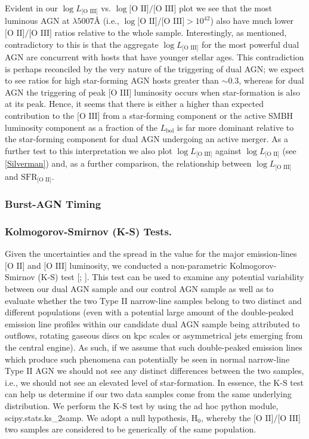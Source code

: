 Evident in our $\log{L_{\text{[O III]}}}$ vs. $\log{\text{[O II]}/\text{[O III]}}$ plot we see that the most luminous AGN at $\lambda5007$Å (i.e., $\log{\text{[O II]}/\text{[O III]}}>{10^{42}}$) also have much lower $\text{[O II]}/\text{[O III]}$ ratios relative to the whole sample. Interestingly, as mentioned, contradictory to this is that the aggregate $\log{L_{\text{[O III]}}}$ for the most powerful dual AGN are concurrent with hosts that have younger stellar ages. This contradiction is perhaps reconciled by the very nature of the triggering of dual AGN; we expect to see ratios for high star-forming AGN hosts greater than $\sim{0.3}$, whereas for dual AGN the triggering of peak $\text{[O III]}$ luminosity occurs when star-formation is also at its peak. Hence, it seems that there is either a higher than expected contribution to the $\text{[O III]}$ from a star-forming component or the active SMBH luminosity component as a fraction of the $L_{\text{bol}}$ is far more dominant relative to the star-forming component for dual AGN undergoing an active merger. As a further test to this interpretation we also plot $\log{L_{\text{[O III]}}}$ against $\log{L_{\text{[O II]}}}$ (see \ref{Silverman}) and, as a further comparison, the relationship between $\log{L_{\text{[O III]}}}$ and $\text{SFR}_{\text{[O II]}}$.

\subsubsection{Burst-AGN Timing}


 
\subsubsection{Kolmogorov-Smirnov (K-S) Tests.}

Given the uncertainties and the spread in the value for the major emission-lines $\text{[O II]}$ and $\text{[O III]}$ luminosity, we conducted a non-parametric Kolmogorov-Smirnov (K-S) test [\cite{Peacock_1983}; \cite{Justel_1997}]. This test can be used to examine any potential variability between our dual AGN sample and our control AGN sample as well as to evaluate whether the two Type II narrow-line samples belong to two distinct and different populations (even with a potential large amount of the double-peaked emission line profiles within our candidate dual AGN sample being attributed to outflows, rotating gaseous discs on kpc scales or asymmetrical jets emerging from the central engine). As such, if we assume that such double-peaked emission lines which produce such phenomena can potentially be seen in normal narrow-line Type II AGN we should not see any distinct differences between the two samples, i.e., we should not see an elevated level of star-formation. In essence, the K-S test can help us determine if our two data samples come from the same underlying distribution. We perform the K-S test by using the ad hoc python module, scipy.stats.ks_2samp. We adopt a null hypothesis, $\text{H}_{0}$, whereby the $\text{[O II]}/\text{[O III]}$ two samples are considered to be generically of the same population.  

